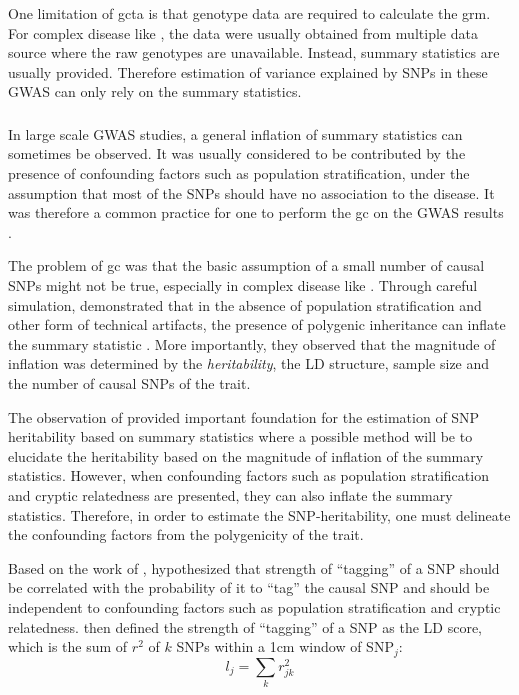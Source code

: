 	One limitation of \gls{gcta} is that genotype data are required to calculate the \gls{grm}.
	For complex disease like , the data were usually obtained from multiple data source where the raw genotypes are unavailable.
	Instead, summary statistics are usually provided.
	Therefore estimation of variance explained by \glspl{SNP} in these \gls{GWAS} can only rely on the summary statistics. 
	
	\subsubsection{}
	In large scale \gls{GWAS} studies, a general inflation of summary statistics can sometimes be observed.
	It was usually considered to be contributed by the presence of confounding factors such as population stratification, under the assumption that most of the \glspl{SNP} should have no association to the disease.
	It was therefore a common practice for one to perform the \gls{gc} on the \gls{GWAS} results \citep{Zheng2006}.
	
	The problem of \gls{gc} was that the basic assumption of a small number of causal \glspl{SNP} might not be true, especially in complex disease like .
	Through careful simulation, \citet{Yang2011b} demonstrated that in the absence of population stratification and other form of technical artifacts, the presence of polygenic inheritance can inflate the summary statistic \citep{Yang2011b}.
	More importantly, they observed that the magnitude of inflation was determined by the \emph{heritability}, the \gls{LD} structure, sample size and the number of causal \glspl{SNP} of the trait.
	
	The observation of \citet{Yang2011b} provided important foundation for the estimation of \gls{SNP} heritability based on summary statistics where a possible method will be to elucidate the heritability based on the magnitude of inflation of the summary statistics. 
	However, when confounding factors such as population stratification and cryptic relatedness are presented, they can also inflate the summary statistics.
	Therefore, in order to estimate the \gls{SNP}-heritability, one must delineate the confounding factors from the polygenicity of the trait.
	
	Based on the work of \citet{Yang2011b}, \citet{Bulik-Sullivan2015} hypothesized that strength of ``tagging'' of a \gls{SNP} should be correlated with the probability of it to ``tag'' the causal \gls{SNP} and should be independent to confounding factors such as population stratification and cryptic relatedness.
	\citet{Bulik-Sullivan2015} then defined the strength of ``tagging'' of a \gls{SNP} as the \gls{LD} score, which is the sum of $r^2$ of $k$ \glspl{SNP} within a 1\gls{cm} window of \gls{SNP}$_j$:
	\begin{equation}
	l_j = \sum_kr^2_{jk}
	\label{eq:ldScore}
	\end{equation}
	
